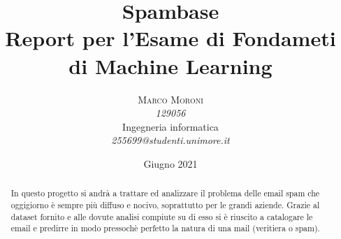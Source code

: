 \documentclass[12pt,a4paper]{article}
\begin{document}
\title{Spambase\\
\Large{Report per l'Esame di Fondameti di Machine Learning}
} %

\author{\textsc{Marco Moroni} \\
    \emph{129056} \\
    Ingegneria informatica\\
    \emph{255699@studenti.unimore.it}
  }

\date{Giugno 2021}
\maketitle
\clearpage
\tableofcontents{}
\clearpage
\begin{abstract}
\normalsize
In questo progetto si andrà a trattare ed analizzare il problema delle email spam che oggigiorno è sempre più diffuso e nocivo, soprattutto per le grandi aziende. Grazie al dataset fornito e alle dovute analisi compiute su di esso si è riuscito a catalogare le email e predirre in modo pressochè perfetto la natura di una mail (veritiera o spam).
\end{abstract}

\clearpage
\end{document}

